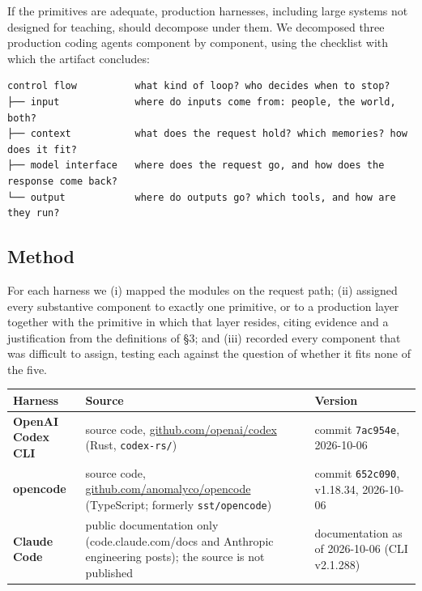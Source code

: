 If the primitives are adequate, production harnesses, including large systems not designed for teaching, should decompose under them. We decomposed three production coding agents component by component, using the checklist with which the artifact concludes:

\begin{lstlisting}
control flow          what kind of loop? who decides when to stop?
├── input             where do inputs come from: people, the world, both?
├── context           what does the request hold? which memories? how does it fit?
├── model interface   where does the request go, and how does the response come back?
└── output            where do outputs go? which tools, and how are they run?
\end{lstlisting}

\subsection{Method}

For each harness we (i) mapped the modules on the request path; (ii) assigned every substantive component to exactly one primitive, or to a production layer together with the primitive in which that layer resides, citing evidence and a justification from the definitions of §3; and (iii) recorded every component that was difficult to assign, testing each against the question of whether it fits none of the five.

{\def\LTcaptype{none} 
\begin{longtable}[]{@{}
  >{\raggedright\arraybackslash}p{}
  >{\raggedright\arraybackslash}p{}
  >{\raggedright\arraybackslash}p{}@{}}
\toprule\noalign{}
\begin{minipage}[b]{\linewidth}\raggedright
Harness
\end{minipage} & \begin{minipage}[b]{\linewidth}\raggedright
Source
\end{minipage} & \begin{minipage}[b]{\linewidth}\raggedright
Version
\end{minipage} \\
\midrule\noalign{}
\endhead
\bottomrule\noalign{}
\endlastfoot
\textbf{OpenAI Codex CLI} \cite{codex} & source code, \href{https://github.com/openai/codex}{github.com/openai/codex} (Rust, \passthrough{\lstinline!codex-rs/!}) & commit \passthrough{\lstinline!7ac954e!}, 2026-10-06 \\
\textbf{opencode} \cite{opencode} & source code, \href{https://github.com/anomalyco/opencode}{github.com/anomalyco/opencode} (TypeScript; formerly \passthrough{\lstinline!sst/opencode!}) & commit \passthrough{\lstinline!652c090!}, v1.18.34, 2026-10-06 \\
\textbf{Claude Code} \cite{claudecode} & public documentation only (code.claude.com/docs and Anthropic engineering posts); the source is not published & documentation as of 2026-10-06 (CLI v2.1.288) \\
\end{longtable}
}

